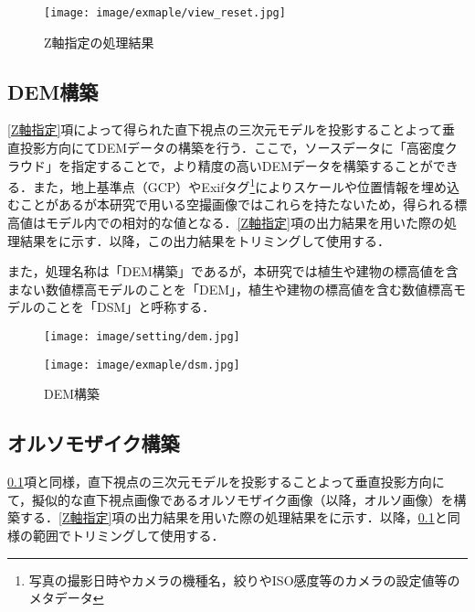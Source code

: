       \begin{figure}[tbp]
        \centering
        \texttt{[image: image/exmaple/view\_reset.jpg]}
        \caption{Z軸指定の処理結果}
        \label{Z軸指定結果}
      \end{figure}


    \subsection{DEM構築}
      \label{DEM構築}
      \ref{Z軸指定}項によって得られた直下視点の三次元モデルを投影することよって垂直投影方向にてDEMデータの構築を行う．ここで，ソースデータに「高密度クラウド」を指定することで，より精度の高いDEMデータを構築することができる．また，地上基準点（GCP）やExifタグ\footnote{写真の撮影日時やカメラの機種名，絞りやISO感度等のカメラの設定値等のメタデータ}によりスケールや位置情報を埋め込むことがあるが本研究で用いる空撮画像ではこれらを持たないため，得られる標高値はモデル内での相対的な値となる．\ref{Z軸指定}項の出力結果を用いた際の処理結果をに示す．以降，この出力結果をトリミングして使用する．

      また，処理名称は「DEM構築」であるが，本研究では植生や建物の標高値を含まない数値標高モデルのことを「DEM」，植生や建物の標高値を含む数値標高モデルのことを「DSM」と呼称する．

      \begin{figure}[tbp]
        \begin{minipage}[c]{0.45\hsize}
          \centering
          \texttt{[image: image/setting/dem.jpg]}
        \end{minipage}
        \begin{minipage}[c]{0.45\hsize}
          \centering
          \texttt{[image: image/exmaple/dsm.jpg]}
        \end{minipage}
        \caption{DEM構築}
        \label{DEM構築結果}
      \end{figure}


    \subsection{オルソモザイク構築}
      \label{オルソモザイク構築}
      \ref{DEM構築}項と同様，直下視点の三次元モデルを投影することよって垂直投影方向にて，擬似的な直下視点画像であるオルソモザイク画像（以降，オルソ画像）を構築する．\ref{Z軸指定}項の出力結果を用いた際の処理結果をに示す．以降，\ref{DEM構築}と同様の範囲でトリミングして使用する．

